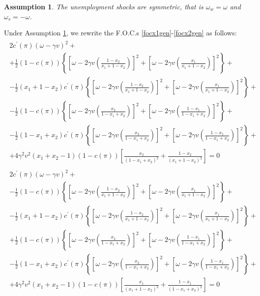 \documentclass[12pt,a4paper]{article}
\newtheorem{assumption}{Assumption}
\begin{document}
\begin{assumption}
\label{Ass3}
    The unemployment shocks are symmetric, that is $\omega_w=\omega$ and $\omega_s=-\omega$.
\end{assumption}
Under Assumption \ref{Ass3}, we rewrite the F.O.C.s \eqref{focx1gen}-\eqref{focx2gen} as follows:
\begin{eqnarray}
\label{focx1}
    \begin{split}
        2c^\prime(\pi)(\omega-\gamma v)^2+ \\
        +\frac{1}{2}(1-c(\pi))\left\{\left[\omega-2\gamma v\left(\frac{1-x_2}{x_1+1-x_2}\right)\right]^2+\left[\omega-2\gamma v\left(\frac{x_1}{x_1+1-x_2}\right)\right]^2\right\}+ \\
        -\frac{1}{2}(x_1 + 1-x_2)c^\prime(\pi)\left\{\left[\omega-2\gamma v\left(\frac{1-x_2}{x_1+1-x_2}\right)\right]^2+\left[\omega-2\gamma v\left(\frac{x_1}{x_1+1-x_2}\right)\right]^2\right\}+ \\
        -\frac{1}{2}(1-c(\pi))\left\{\left[\omega-2\gamma v\left(\frac{x_2}{1-x_1+x_2}\right)\right]^2+\left[\omega-2\gamma v\left(\frac{1-x_1}{1-x_1+x_2}\right)\right]^2\right\}+\\
        -\frac{1}{2}(1-x_1 + x_2)c^\prime(\pi)\left\{\left[\omega-2\gamma v\left(\frac{x_2}{1-x_1+x_2}\right)\right]^2+\left[\omega-2\gamma v\left(\frac{1-x_1}{1-x_1+x_2}\right)\right]^2\right\}+\\
        +4\gamma^2 v^2(x_1+x_2-1)(1-c(\pi))\left[\frac{x_2}{(1-x_1+x_2)^2}+\frac{1-x_2}{(x_1+1-x_2)^2}\right]=0
    \end{split} \\
    \label{focx2}
    \begin{split}
        2c^\prime(\pi)(\omega-\gamma v)^2+ \\
        -\frac{1}{2}(1-c(\pi))\left\{\left[\omega-2\gamma v\left(\frac{1-x_2}{x_1+1-x_2}\right)\right]^2+\left[\omega-2\gamma v\left(\frac{x_1}{x_1+1-x_2}\right)\right]^2\right\}+ \\
        -\frac{1}{2}(x_1 + 1-x_2)c^\prime(\pi)\left\{\left[\omega-2\gamma v\left(\frac{1-x_2}{x_1+1-x_2}\right)\right]^2+\left[\omega-2\gamma v\left(\frac{x_1}{x_1+1-x_2}\right)\right]^2\right\}+ \\
        +\frac{1}{2}(1-c(\pi))\left\{\left[\omega-2\gamma v\left(\frac{x_2}{1-x_1+x_2}\right)\right]^2+\left[\omega-2\gamma v\left(\frac{1-x_1}{1-x_1+x_2}\right)\right]^2\right\}+\\
        -\frac{1}{2}(1-x_1 + x_2)c^\prime(\pi)\left\{\left[\omega-2\gamma v\left(\frac{x_2}{1-x_1+x_2}\right)\right]^2+\left[\omega-2\gamma v\left(\frac{1-x_1}{1-x_1+x_2}\right)\right]^2\right\}+\\
        +4\gamma^2 v^2(x_1+x_2-1)(1-c(\pi))\left[\frac{x_1}{(x_1+1-x_2)^2}+\frac{1-x_1}{(1-x_1+x_2)^2}\right]=0
    \end{split}
\end{eqnarray}
\end{document}
